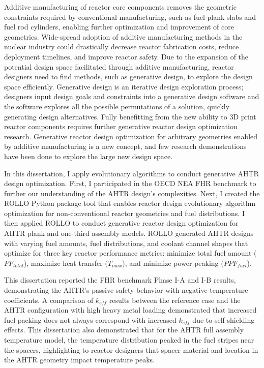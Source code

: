 
Additive manufacturing of reactor core components removes the geometric constraints
required by conventional manufacturing, such as fuel plank slabs and fuel rod 
cylinders, enabling further optimization and improvement of core geometries. 
Wide-spread adoption of additive manufacturing methods in the nuclear industry 
could drastically decrease reactor fabrication costs, reduce deployment timelines, 
and improve reactor safety. 
Due to the expansion of the potential design space facilitated through additive 
manufacturing, reactor designers need to find methods, such as generative 
design, to explore the design space efficiently.
Generative design is an iterative design exploration process; designers input design 
goals and constraints into a generative design software and the software explores 
all the possible permutations of a solution, quickly generating design alternatives. 
Fully benefitting from the new ability to 3D print reactor components requires further 
generative reactor design optimization research.  
Generative reactor design optimization for arbitrary geometries enabled by additive 
manufacturing is a new concept, and few research demonstrations have been done to 
explore the large new design space. 

In this dissertation, I apply evolutionary algorithms to conduct generative \gls{AHTR} 
design optimization. 
First, I participated in the \gls{OECD} \gls{NEA} \gls{FHR} benchmark to further our 
understanding of the \gls{AHTR} design's complexities.  
Next, I created the \gls{ROLLO} Python package tool that enables reactor design 
evolutionary algorithm optimization for non-conventional reactor geometries and fuel 
distributions. 
I then applied \gls{ROLLO} to conduct generative reactor design optimization
for \gls{AHTR} plank and one-third assembly models.
\gls{ROLLO} generated \gls{AHTR} designs with varying fuel amounts, fuel 
distributions, and coolant channel shapes that optimize for three key reactor 
performance metrics: minimize total fuel amount ($PF_{total}$), maximize heat 
transfer ($T_{max}$), and minimize power peaking ($PPF_{fuel}$).

This dissertation reported the \gls{FHR} benchmark Phase I-A and I-B results, 
demonstrating the \gls{AHTR}'s passive safety behavior with 
negative temperature coefficients.
A comparison of $k_{eff}$ results between the reference case and the \gls{AHTR} 
configuration with high heavy metal loading demonstrated that increased fuel 
packing does not always correspond with increased $k_{eff}$ due to self-shielding 
effects.
This dissertation also demonstrated that for the \gls{AHTR} full assembly temperature 
model, the temperature distribution peaked in the fuel stripes near the spacers, 
highlighting to reactor designers that spacer material and location in the 
\gls{AHTR} geometry impact temperature peaks.  

